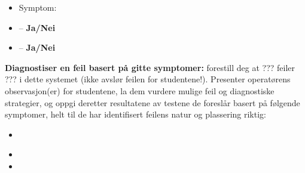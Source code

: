 \begin{itemize}
\item{} Symptom: {\it }
\item{}  -- {\bf Ja/Nei}
\item{}  -- {\bf Ja/Nei}
\end{itemize}


\vskip 10pt


\noindent
{\bf Diagnostiser en feil basert på gitte symptomer:} forestill deg at ??? feiler ??? i dette systemet (ikke avslør feilen for studentene!). Presenter operatørens observasjon(er) for studentene, la dem vurdere mulige feil og diagnostiske strategier, og oppgi deretter resultatene av testene de foreslår basert på følgende symptomer, helt til de har identifisert feilens natur og plassering riktig:

\begin{itemize}
\item{} {\it }
\item{} 
\item{} 
\end{itemize}


